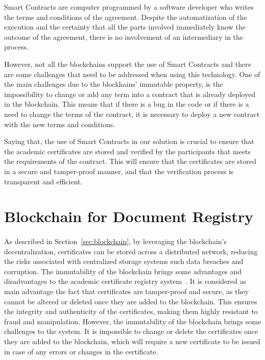Smart Contracts are computer programmed by a software developer who writes the terms and conditions of the agreement. Despite the automatization of the execution and the certainty that all the parts
involved immediately know the outcome of the agreement, there is no involvement of an intermediary in the process.

However, not all the blockchains support the use of Smart Contracts and there are some challenges that need to be addressed when using this technology.
One of the main challenges due to the blockhains' immutable property, is the impossibility to change or add any term into a contract that is already deployed in the blockchain.
This means that if there is a bug in the code or if there is a need to change the terms of the contract, it is necessary to deploy a new contract with the new terms and conditions.

Saying that, the use of Smart Contracts in our solution is crucial to ensure that the academic certificates are stored and verified by the participants that meets the requirements of the contract.
This will ensure that the certificates are stored in a secure and tamper-proof manner, and that the verification process is transparent and efficient.

\section{Blockchain for Document Registry}\label{sec:blockchain-academic-certificate-registry}
\paragraph{}

As described in Section~\ref{sec:blockchain}, by leveraging the blockchain's decentralization, certificates can be stored across a distributed network,
reducing the risks associated with centralized storage systems such data breaches and corruption.
The immutability of the blockchain brings some advantages and disadvantages to the academic certificate registry system~\cite{nzuva2019smart}.
It is considered as main advantage the fact that certificates are tamper-proof and secure, as they cannot be altered or deleted once they are added to the blockchain. This ensures the
integrity and authenticity of the certificates, making them highly resistant to fraud and manipulation.
However, the immutability of the blockchain brings some challenges to the system. It is impossible to change or delete the certificates once they are added to the blockchain, which will
require a new certificate to be issued in case of any errors or changes in the certificate.

